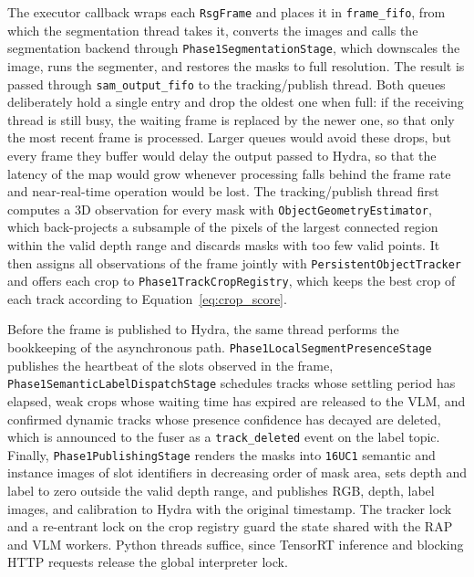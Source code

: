 {\small The executor callback wraps each \texttt{RsgFrame} and places it in \texttt{frame\_\allowbreak{}fifo}, from which the segmentation thread takes it, converts the images and calls the segmentation backend through \texttt{Phase1\allowbreak{}Segmentation\allowbreak{}Stage}, which downscales the image, runs the segmenter, and restores the masks to full resolution. The result is passed through \texttt{sam\_\allowbreak{}output\_\allowbreak{}fifo} to the tracking/publish thread. Both queues deliberately hold a single entry and drop the oldest one when full: if the receiving thread is still busy, the waiting frame is replaced by the newer one, so that only the most recent frame is processed. Larger queues would avoid these drops, but every frame they buffer would delay the output passed to Hydra, so that the latency of the map would grow whenever processing falls behind the frame rate and near-real-time operation would be lost. The tracking/publish thread first computes a 3D observation for every mask with \texttt{Object\allowbreak{}Geometry\allowbreak{}Estimator}, which back-projects a subsample of the pixels of the largest connected region within the valid depth range and discards masks with too few valid points. It then assigns all observations of the frame jointly with \texttt{Persistent\allowbreak{}Object\allowbreak{}Tracker} and offers each crop to \texttt{Phase1\allowbreak{}Track\allowbreak{}Crop\allowbreak{}Registry}, which keeps the best crop of each track according to Equation~\ref{eq:crop_score}.\par}

{\small Before the frame is published to Hydra, the same thread performs the bookkeeping of the asynchronous path. \texttt{Phase1\allowbreak{}Local\allowbreak{}Segment\allowbreak{}Presence\allowbreak{}Stage} publishes the heartbeat of the slots observed in the frame, \texttt{Phase1\allowbreak{}Semantic\allowbreak{}Label\allowbreak{}Dispatch\allowbreak{}Stage} schedules tracks whose settling period has elapsed, weak crops whose waiting time has expired are released to the VLM, and confirmed dynamic tracks whose presence confidence has decayed are deleted, which is announced to the fuser as a \texttt{track\_\allowbreak{}deleted} event on the label topic. Finally, \texttt{Phase1\allowbreak{}Publishing\allowbreak{}Stage} renders the masks into \texttt{16UC1} semantic and instance images of slot identifiers in decreasing order of mask area, sets depth and label to zero outside the valid depth range, and publishes RGB, depth, label images, and calibration to Hydra with the original timestamp. The tracker lock and a re-entrant lock on the crop registry guard the state shared with the RAP and VLM workers. Python threads suffice, since TensorRT inference and blocking HTTP requests release the global interpreter lock.\par}

